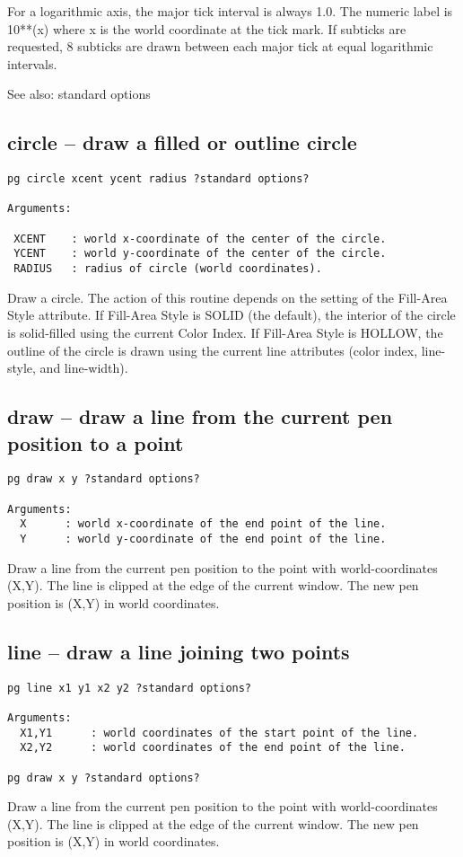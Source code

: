 For a logarithmic axis, the major tick interval is always 1.0. The
numeric label is 10**(x) where x is the world coordinate at the
tick mark. If subticks are requested, 8 subticks are drawn between
each major tick at equal logarithmic intervals.

See also: standard options

\subsection{circle -- draw a filled or outline circle}
\begin{verbatim}
pg circle xcent ycent radius ?standard options?

Arguments:

 XCENT    : world x-coordinate of the center of the circle.
 YCENT    : world y-coordinate of the center of the circle.
 RADIUS   : radius of circle (world coordinates).
\end{verbatim}
Draw a circle. The action of this routine depends
on the setting of the Fill-Area Style attribute. If Fill-Area Style
is SOLID (the default), the interior of the circle is solid-filled
using the current Color Index. If Fill-Area Style is HOLLOW, the
outline of the circle is drawn using the current line attributes
(color index, line-style, and line-width).


\subsection{draw -- draw a line from the current pen position to a point}
\begin{verbatim}
pg draw x y ?standard options?

Arguments:
  X      : world x-coordinate of the end point of the line.
  Y      : world y-coordinate of the end point of the line.
\end{verbatim}
Draw a line from the current pen position to the point
with world-coordinates (X,Y). The line is clipped at the edge of the
current window. The new pen position is (X,Y) in world coordinates.

\subsection{line -- draw a line joining two points}
\begin{verbatim}
pg line x1 y1 x2 y2 ?standard options?

Arguments:
  X1,Y1      : world coordinates of the start point of the line.
  X2,Y2      : world coordinates of the end point of the line.

pg draw x y ?standard options?
\end{verbatim}
Draw a line from the current pen position to the point
with world-coordinates (X,Y). The line is clipped at the edge of the
current window. The new pen position is (X,Y) in world coordinates.


